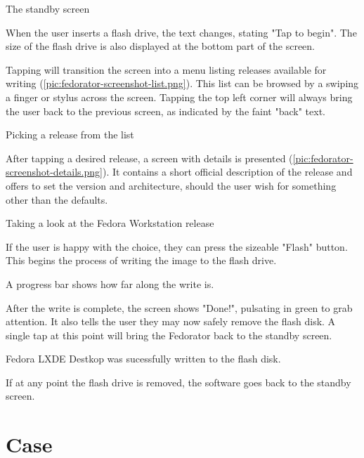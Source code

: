             {The standby screen}
        
        When the user inserts a flash drive, the text changes, stating "Tap to begin".  The size of the flash drive is also displayed at the bottom part of the screen.
        
        Tapping will transition the screen into a menu listing releases available for writing (\ref{pic:fedorator-screenshot-list.png}).  This list can be browsed by a swiping a finger or stylus across the screen.  Tapping the top left corner will always bring the user back to the previous screen, as indicated by the faint "back" text. 
        
            {Picking a release from the list}
        
        After tapping a desired release, a screen with details is presented (\ref{pic:fedorator-screenshot-details.png}).  It contains a short official description of the release and offers to set the version and architecture, should the user wish for something other than the defaults.
        
            {Taking a look at the Fedora Workstation release}
        
        If the user is happy with the choice, they can press the sizeable "Flash" button.  This begins the process of writing the image to the flash drive.
        
        
        A progress bar shows how far along the write is.
        
        After the write is complete, the screen shows "Done!", pulsating in green to grab attention.  It also tells the user they may now safely remove the flash disk.  A single tap at this point will bring the Fedorator back to the standby screen.
        
            {Fedora LXDE Destkop was sucessfully written to the flash disk.}
        
        If at any point the flash drive is removed, the software goes back to the standby screen.
        
    \section{Case}
